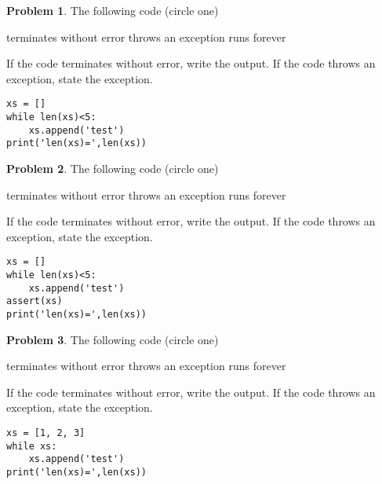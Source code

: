 \documentclass[10pt]{article}
\theoremstyle{definition}
\newtheorem{problem}{Problem}
\begin{document}
\newpage
\begin{problem}
    The following code (circle one)

    \vspace{0.25in}
    \hspace{0.5in}terminates without error 
    \hspace{1in}throws an exception
    \hspace{1in}runs forever
    \vspace{0.25in}

    \noindent
    If the code terminates without error, write the output.
    If the code throws an exception, state the exception.
\end{problem}
\begin{lstlisting}
xs = []
while len(xs)<5:
    xs.append('test')
print('len(xs)=',len(xs))
\end{lstlisting}
\vspace{1in}


\begin{problem}
    The following code (circle one)

    \vspace{0.25in}
    \hspace{0.5in}terminates without error 
    \hspace{1in}throws an exception
    \hspace{1in}runs forever
    \vspace{0.25in}

    \noindent
    If the code terminates without error, write the output.
    If the code throws an exception, state the exception.
\end{problem}
\begin{lstlisting}
xs = []
while len(xs)<5:
    xs.append('test')
assert(xs)
print('len(xs)=',len(xs))
\end{lstlisting}
\vspace{1in}


\begin{problem}
    The following code (circle one)

    \vspace{0.25in}
    \hspace{0.5in}terminates without error 
    \hspace{1in}throws an exception
    \hspace{1in}runs forever
    \vspace{0.25in}

    \noindent
    If the code terminates without error, write the output.
    If the code throws an exception, state the exception.
\end{problem}
\begin{lstlisting}
xs = [1, 2, 3]
while xs:
    xs.append('test')
print('len(xs)=',len(xs))
\end{lstlisting}
\vspace{1in}
\end{document}
